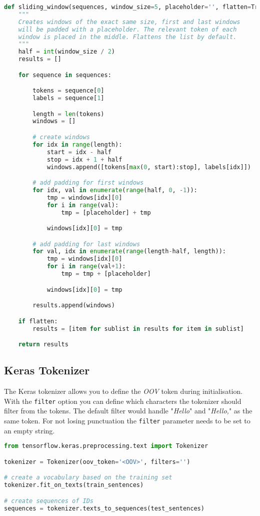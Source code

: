 \begin{lstlisting}[language=Python, label={code:sliding-window}, caption=Sliding window implementation]
def sliding_window(sequences, window_size=5, placeholder='', flatten=True):
    """
    Creates windows of the exact same size, first and last windows
    will be padded with a placeholder. The relevant token of each
    window is placed in the middle. Flattens the list by default.
    """
    half = int(window_size / 2)
    results = []

    for sequence in sequences:

        tokens = sequence[0]
        labels = sequence[1]

        length = len(tokens)
        windows = []

        # create windows
        for idx in range(length):
            start = idx - half
            stop = idx + 1 + half
            windows.append([tokens[max(0, start):stop], labels[idx]])

        # add padding for first windows
        for idx, val in enumerate(range(half, 0, -1)):
            tmp = windows[idx][0]
            for i in range(val):
                tmp = [placeholder] + tmp

            windows[idx][0] = tmp

        # add padding for last windows
        for val, idx in enumerate(range(length-half, length)):
            tmp = windows[idx][0]
            for i in range(val+1):
                tmp = tmp + [placeholder]

            windows[idx][0] = tmp

        results.append(windows)

    if flatten:
        results = [item for sublist in results for item in sublist]

    return results
\end{lstlisting}

\subsection{Keras Tokenizer}

The Keras tokenizer allows you to define the \emph{OOV} token during initialisation. With the \verb|filter| option you can define which characters the
tokenizer should filter from the tokens. The default filter would handle "\emph{Hello}" and "\emph{Hello,}" as the same token. For not losing punctuation
the \verb|filter| parameter needs to be set to an empty string.

\begin{lstlisting}[language=Python, label={code:keras-tokenizer}, caption=Fitting the Keras tokenizer]
from tensorflow.keras.preprocessing.text import Tokenizer

tokenizer = Tokenizer(oov_token='<OOV>', filters='')

# create a vocabulary based on the training set
tokenizer.fit_on_texts(train_sentences)

# create sequences of IDs
sequences = tokenizer.texts_to_sequences(test_sentences)
\end{lstlisting}
